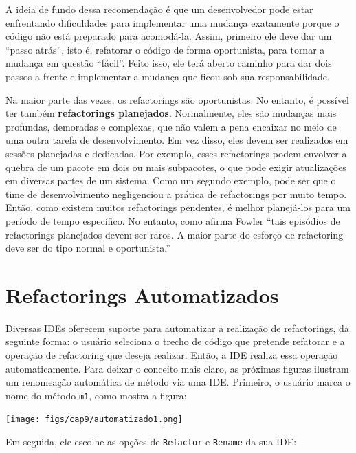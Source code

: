 \documentclass[
  11pt,
  twoside]{book}
\newcommand{\passthrough}[1]{#1}
\begin{document}
A ideia de fundo dessa recomendação é que um desenvolvedor pode estar
enfrentando dificuldades para implementar uma mudança exatamente porque
o código não está preparado para acomodá-la. Assim, primeiro ele deve
dar um ``passo atrás'', isto é, refatorar o código de forma oportunista,
para tornar a mudança em questão ``fácil''. Feito isso, ele terá aberto
caminho para dar dois passos a frente e implementar a mudança que ficou
sob sua responsabilidade.

  Na maior parte das
vezes, os refactorings são oportunistas. No entanto, é possível ter
também \textbf{refactorings planejados}. Normalmente, eles são mudanças
mais profundas, demoradas e complexas, que não valem a pena encaixar no
meio de uma outra tarefa de desenvolvimento. Em vez disso, eles devem
ser realizados em sessões planejadas e dedicadas. Por exemplo, esses
refactorings podem envolver a quebra de um pacote em dois ou mais
subpacotes, o que pode exigir atualizações em diversas partes de um
sistema. Como um segundo exemplo, pode ser que o time de desenvolvimento
negligenciou a prática de refactorings por muito tempo. Então, como
existem muitos refactorings pendentes, é melhor planejá-los para um
período de tempo específico. No entanto, como afirma Fowler ``tais
episódios de refactorings planejados devem ser raros. A maior parte do
esforço de refactoring deve ser do tipo normal e oportunista.''

\hypertarget{refactorings-automatizados}{%
\section{Refactorings Automatizados}\label{refactorings-automatizados}}


Diversas IDEs oferecem suporte para automatizar a realização de
refactorings, da seguinte forma: o usuário seleciona o trecho de código
que pretende refatorar e a operação de refactoring que deseja realizar.
Então, a IDE realiza essa operação automaticamente. Para deixar o
conceito mais claro, as próximas figuras ilustram um renomeação
automática de método via uma IDE. Primeiro, o usuário marca o nome do
método \passthrough{\lstinline!m1!}, como mostra a figura:

\texttt{[image: figs/cap9/automatizado1.png]}

Em seguida, ele escolhe as opções de \passthrough{\lstinline!Refactor!}
e \passthrough{\lstinline!Rename!} da sua IDE:
\end{document}
